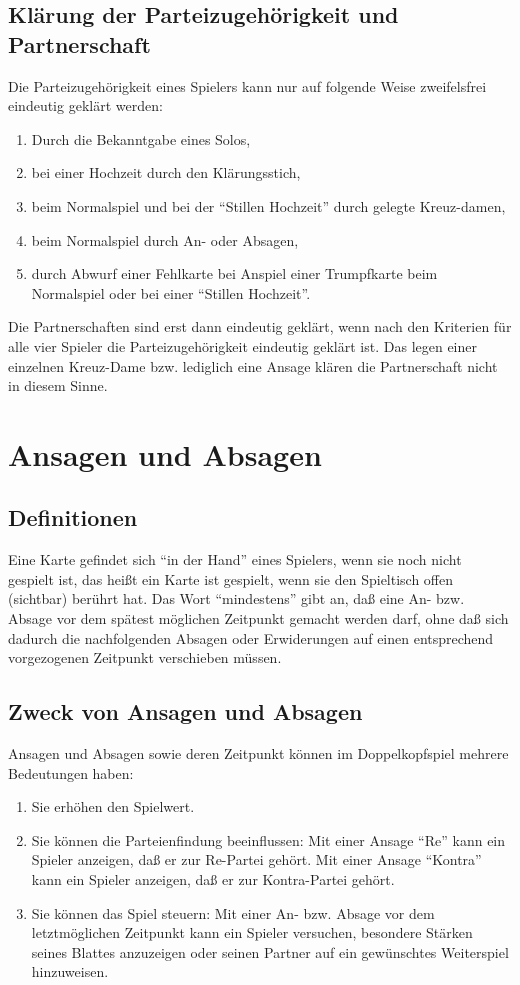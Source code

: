 \documentclass[12pt]{scrartcl}
\begin{document}
\subsection{Klärung der Parteizugehörigkeit und Partnerschaft}
Die Parteizugehörigkeit eines Spielers kann nur auf folgende
Weise zweifelsfrei eindeutig geklärt werden:
\begin{enumerate}
  \item Durch die Bekanntgabe eines Solos,
  \item bei einer Hochzeit durch den Klärungsstich,
  \item beim Normalspiel und bei der "`Stillen Hochzeit"' durch gelegte Kreuz-damen,
  \item beim Normalspiel durch An- oder Absagen,
  \item durch Abwurf einer Fehlkarte bei Anspiel einer Trumpfkarte beim Normalspiel oder bei einer "`Stillen Hochzeit"'.
\end{enumerate}
Die Partnerschaften sind erst dann eindeutig geklärt, wenn nach
den Kriterien für alle vier Spieler die Parteizugehörigkeit
eindeutig geklärt ist. Das legen einer einzelnen Kreuz-Dame bzw.
lediglich eine Ansage klären die Partnerschaft nicht in diesem
Sinne.


\section{Ansagen und Absagen}

\subsection{Definitionen}
Eine Karte gefindet sich "`in der Hand"' eines Spielers, wenn sie
noch nicht gespielt ist, das heißt ein Karte ist gespielt, wenn
sie den Spieltisch offen (sichtbar) berührt hat. Das Wort
"`mindestens"' gibt an, daß eine An- bzw. Absage vor dem
spätest möglichen Zeitpunkt gemacht werden darf, ohne daß sich
dadurch die nachfolgenden Absagen oder Erwiderungen auf einen
entsprechend vorgezogenen Zeitpunkt verschieben müssen.

\subsection{Zweck von Ansagen und Absagen}
Ansagen und Absagen sowie deren Zeitpunkt können im Doppelkopfspiel mehrere Bedeutungen haben:
\begin{enumerate}
  \item Sie erhöhen den Spielwert.
  \item Sie können die Parteienfindung beeinflussen: Mit einer Ansage "`Re"' kann ein Spieler anzeigen, daß er zur Re-Partei gehört.
    Mit einer Ansage "`Kontra"' kann ein Spieler anzeigen, daß er zur Kontra-Partei gehört.
  \item Sie können das Spiel steuern:
    Mit einer An- bzw. Absage vor dem letztmöglichen Zeitpunkt kann ein Spieler versuchen, besondere Stärken seines
    Blattes anzuzeigen oder seinen Partner auf ein gewünschtes Weiterspiel hinzuweisen.
\end{enumerate}
\end{document}
